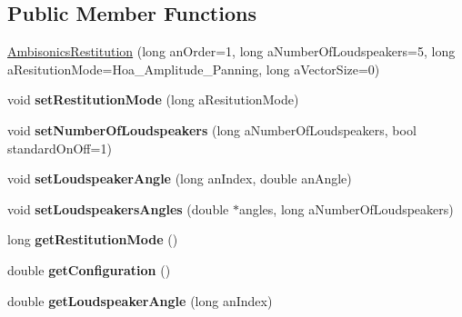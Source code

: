 \subsection*{Public Member Functions}
\begin{DoxyCompactItemize}
\item 
\hyperlink{class_ambisonics_restitution_a287ce5a5b5d247af6c11e7bd0e50a4ab}{Ambisonics\-Restitution} (long an\-Order=1, long a\-Number\-Of\-Loudspeakers=5, long a\-Resitution\-Mode=Hoa\-\_\-\-Amplitude\-\_\-\-Panning, long a\-Vector\-Size=0)
\item 
\hypertarget{class_ambisonics_restitution_a26b720484714bfd5d838799a8bd14b15}{void {\bfseries set\-Restitution\-Mode} (long a\-Resitution\-Mode)}\label{class_ambisonics_restitution_a26b720484714bfd5d838799a8bd14b15}

\item 
\hypertarget{class_ambisonics_restitution_aa596940fef66d9e7094977533c981c7d}{void {\bfseries set\-Number\-Of\-Loudspeakers} (long a\-Number\-Of\-Loudspeakers, bool standard\-On\-Off=1)}\label{class_ambisonics_restitution_aa596940fef66d9e7094977533c981c7d}

\item 
\hypertarget{class_ambisonics_restitution_a6aafaf436e115524fc51eb5033bdf623}{void {\bfseries set\-Loudspeaker\-Angle} (long an\-Index, double an\-Angle)}\label{class_ambisonics_restitution_a6aafaf436e115524fc51eb5033bdf623}

\item 
\hypertarget{class_ambisonics_restitution_a936acf7cb829cbbad814f85e1c8d3150}{void {\bfseries set\-Loudspeakers\-Angles} (double $\ast$angles, long a\-Number\-Of\-Loudspeakers)}\label{class_ambisonics_restitution_a936acf7cb829cbbad814f85e1c8d3150}

\item 
\hypertarget{class_ambisonics_restitution_a1b15c63c310b10efc79628acc6e3e214}{long {\bfseries get\-Restitution\-Mode} ()}\label{class_ambisonics_restitution_a1b15c63c310b10efc79628acc6e3e214}

\item 
\hypertarget{class_ambisonics_restitution_a95681bf8b8f7751ef6b2a09a9b204969}{double {\bfseries get\-Configuration} ()}\label{class_ambisonics_restitution_a95681bf8b8f7751ef6b2a09a9b204969}

\item 
\hypertarget{class_ambisonics_restitution_aa951a434f4daa911e5b54c0893bf608f}{double {\bfseries get\-Loudspeaker\-Angle} (long an\-Index)}\label{class_ambisonics_restitution_aa951a434f4daa911e5b54c0893bf608f}


\end{DoxyCompactItemize}

